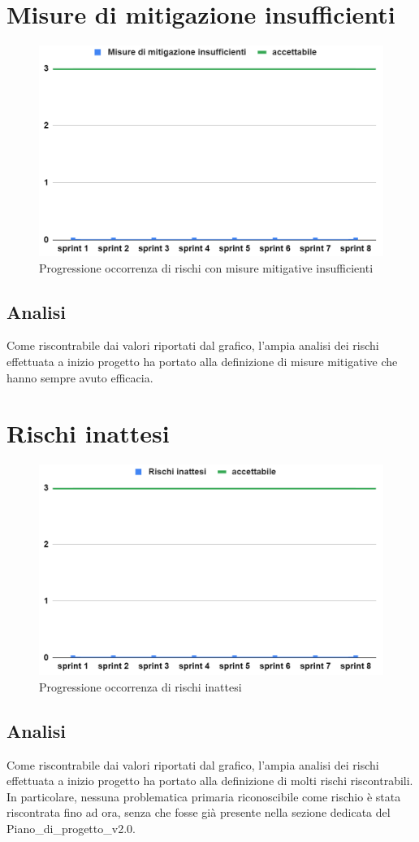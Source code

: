 \section{Misure di mitigazione insufficienti}
\begin{figure}[H]
    \centering
    \includegraphics[width=0.8\linewidth]{Mitigazioni.png}
    \caption{Progressione occorrenza di rischi con misure mitigative insufficienti}
\end{figure}
\subsection{Analisi}
Come riscontrabile dai valori riportati dal grafico, l'ampia analisi dei rischi effettuata a inizio progetto ha portato alla definizione di misure mitigative che hanno sempre avuto efficacia.

\section{Rischi inattesi}
\begin{figure}[H]
    \centering
    \includegraphics[width=0.8\linewidth]{Rischi.png}
    \caption{Progressione occorrenza di rischi inattesi}
\end{figure}
\subsection{Analisi}
Come riscontrabile dai valori riportati dal grafico, l'ampia analisi dei rischi effettuata a inizio progetto ha portato alla definizione di molti rischi riscontrabili. In particolare, nessuna problematica primaria riconoscibile come rischio è stata riscontrata fino ad ora, senza che fosse già presente nella sezione dedicata del Piano\_di\_progetto\_v2.0.

